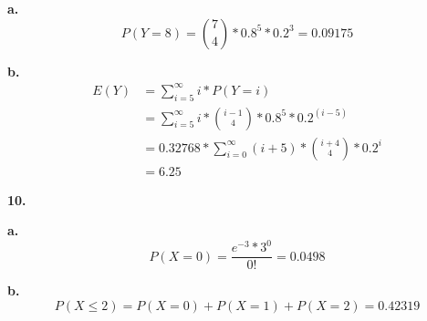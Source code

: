 \documentclass[12pt,fleqn]{article}
\begin{document}
\textbf{a.}
\[P(Y=8)=\binom{7}{4}*0.8^5*0.2^3=0.09175\]

\textbf{b.}
\begin{align*}
  E(Y)&=\sum_{i=5}^{\infty} i*P(Y=i)\\
      &=\sum_{i=5}^{\infty} i*\binom{i-1}{4}*0.8^5*0.2^{(i-5)}\\
      &=0.32768*\sum_{i=0}^{\infty} (i+5)*\binom{i+4}{4}*0.2^i\\
      &=6.25
\end{align*}

\textbf{10.}

\textbf{a.}
\[P(X=0)=\frac{e^{-3}*3^0}{0!}=0.0498\]

\textbf{b.}
\[P(X \le 2)=P(X=0)+P(X=1)+P(X=2)=0.42319\]
\end{document}
